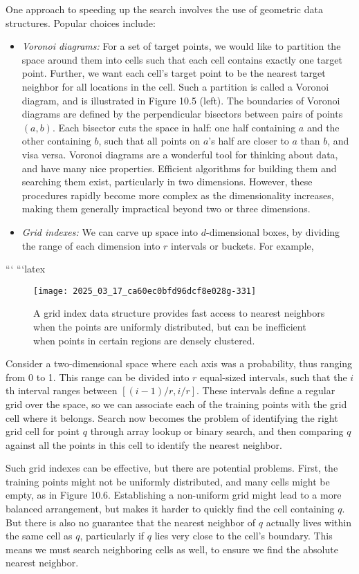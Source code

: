 \documentclass[10pt]{article}
\begin{document}
One approach to speeding up the search involves the use of geometric data structures. Popular choices include:
\begin{itemize}
    \item \textit{Voronoi diagrams:} For a set of target points, we would like to partition the space around them into cells such that each cell contains exactly one target point. Further, we want each cell's target point to be the nearest target neighbor for all locations in the cell. Such a partition is called a Voronoi diagram, and is illustrated in Figure 10.5 (left). The boundaries of Voronoi diagrams are defined by the perpendicular bisectors between pairs of points $(a, b)$. Each bisector cuts the space in half: one half containing $a$ and the other containing $b$, such that all points on $a$'s half are closer to $a$ than $b$, and visa versa. Voronoi diagrams are a wonderful tool for thinking about data, and have many nice properties. Efficient algorithms for building them and searching them exist, particularly in two dimensions. However, these procedures rapidly become more complex as the dimensionality increases, making them generally impractical beyond two or three dimensions.
    \item \textit{Grid indexes:} We can carve up space into $d$-dimensional boxes, by dividing the range of each dimension into $r$ intervals or buckets. For example,
\end{itemize}
```
```latex
\begin{figure}[htbp]
    \centering
    \texttt{[image: 2025\_03\_17\_ca60ec0bfd96dcf8e028g-331]}
    \caption{A grid index data structure provides fast access to nearest neighbors when the points are uniformly distributed, but can be inefficient when points in certain regions are densely clustered.}
\end{figure}

Consider a two-dimensional space where each axis was a probability, thus ranging from 0 to 1. This range can be divided into $r$ equal-sized intervals, such that the $i$th interval ranges between $[(i-1) / r, i / r]$. These intervals define a regular grid over the space, so we can associate each of the training points with the grid cell where it belongs. Search now becomes the problem of identifying the right grid cell for point $q$ through array lookup or binary search, and then comparing $q$ against all the points in this cell to identify the nearest neighbor.

Such grid indexes can be effective, but there are potential problems. First, the training points might not be uniformly distributed, and many cells might be empty, as in Figure 10.6. Establishing a non-uniform grid might lead to a more balanced arrangement, but makes it harder to quickly find the cell containing $q$. But there is also no guarantee that the nearest neighbor of $q$ actually lives within the same cell as $q$, particularly if $q$ lies very close to the cell’s boundary. This means we must search neighboring cells as well, to ensure we find the absolute nearest neighbor.
\end{document}
